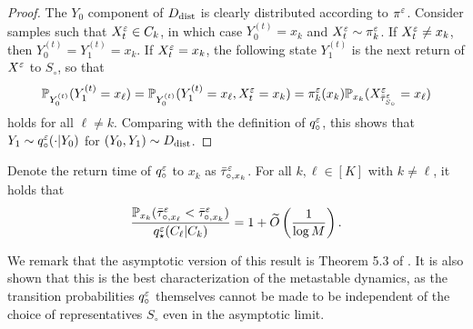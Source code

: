 \begin{proof}
The $Y_0$ component of $D_{\operatorname{dist}}$ is clearly distributed according to $\pi^\varepsilon$. Consider samples such that $X_t^\varepsilon\in C_k$, in which case $Y_0^{(t)}=x_k$ and $X_t^\varepsilon\sim\pi_k^\varepsilon$. If $X_t^\varepsilon\ne x_k$, then $Y_0^{(t)}=Y_1^{(t)}=x_k$. If $X_t^\varepsilon = x_k$, the following state $Y_1^{(t)}$ is the next return of $X^\varepsilon$ to $S_\circ$, so that
\begin{equation*}
\mathbb{P}_{Y_0^{(t)}}(Y_1^{(t)}=x_\ell) = \mathbb{P}_{Y_0^{(t)}}(Y_1^{(t)}=x_\ell, X_t^\varepsilon = x_k) = \pi_k^\varepsilon(x_k) \mathbb{P}_{x_k}(X_{\bar{\tau}_{S_\circ}^\varepsilon}^\varepsilon = x_\ell)
\end{equation*}
holds for all $\ell\ne k$. Comparing with the definition of $q_\circ^\varepsilon$, this shows that $Y_1\sim q_\circ^\varepsilon(\cdot|Y_0)$ for $(Y_0,Y_1)\sim D_{\operatorname{dist}}$.
\end{proof}


\begin{prop}
Denote the return time of $q_\circ^\varepsilon$ to $x_k$ as $\bar{\tau}_{\circ,x_k}^\varepsilon$. For all $k,\ell\in[K]$ with $k\neq\ell$, it holds that
\begin{equation*}
\frac{\mathbb{P}_{x_k}(\bar{\tau}_{\circ,x_\ell}^\varepsilon < \bar{\tau}_{\circ,x_k}^\varepsilon)}{q_\star^\varepsilon(C_\ell|C_k)} = 1+\widetilde{O}\left(\frac{1}{\log M}\right).
\end{equation*}
\end{prop}

We remark that the asymptotic version of this result is Theorem 5.3 of \citet{Betz16}. It is also shown that this is the best characterization of the metastable dynamics, as the transition probabilities $q_\circ^\varepsilon$ themselves cannot be made to be independent of the choice of representatives $S_\circ$ even in the asymptotic limit.

